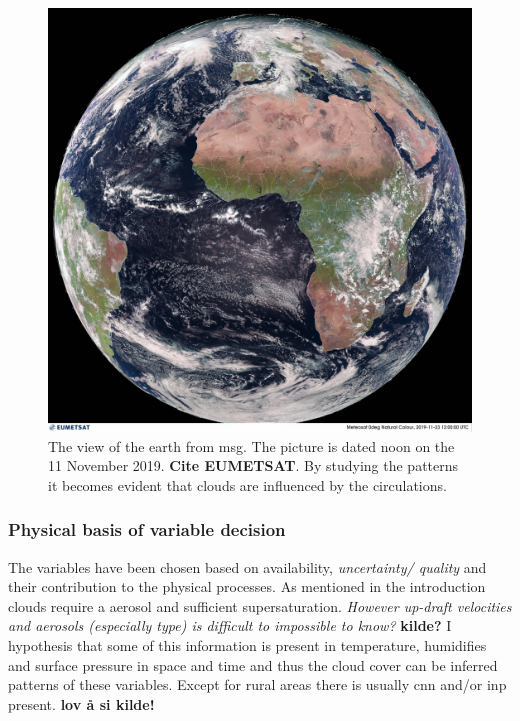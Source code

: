 \begin{figure}[h]
    \centering
    \includegraphics[scale=0.11]{Chapter2_Theory/images/MET10_RGBNatColourEnhncd_FullResolution_20191123120000.jpg}    \caption{The view of the earth from \acrshort{msg}. The picture is dated noon on the 11 November 2019. \textbf{Cite EUMETSAT}. By studying the patterns it becomes evident that clouds are influenced by the circulations. }
    \label{fig:sat_view}
\end{figure}

\subsubsection{Physical basis of variable decision} \label{sec:physical_basis}
The variables have been chosen based on availability, \textit{uncertainty/ quality} and their contribution to the physical processes. As mentioned in the introduction clouds require a aerosol and sufficient supersaturation.\textit{ However up-draft velocities and aerosols (especially type) is difficult to impossible to know?} \textbf{kilde?} I hypothesis that some of this information is present in temperature, humidifies and surface pressure in space and time and thus the cloud cover can be inferred patterns of these variables. Except for rural areas there is usually \acrshort{cnn} and/or \acrshort{inp} present. \textbf{lov å si kilde!}

